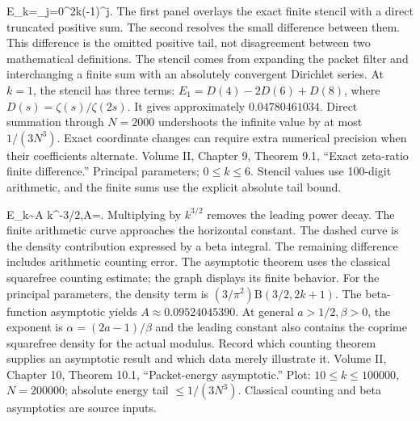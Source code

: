 {E_k=\sum_{j=0}^{2k}(-1)^j.}
{The first panel overlays the exact finite stencil with a direct truncated positive sum. The second resolves the small difference between them. This difference is the omitted positive tail, not disagreement between two mathematical definitions. The stencil comes from expanding the packet filter and interchanging a finite sum with an absolutely convergent Dirichlet series.}
{At $k=1$, the stencil has three terms: $E_1=D(4)-2D(6)+D(8)$, where $D(s)=\zeta(s)/\zeta(2s)$. It gives approximately $0.04780461034$. Direct summation through $N=2000$ undershoots the infinite value by at most $1/(3N^3)$.}
{Exact coordinate changes can require extra numerical precision when their coefficients alternate.}
{Volume II, Chapter 9, Theorem 9.1, ``Exact zeta-ratio finite difference.'' Principal parameters; $0\le k\le6$. Stencil values use 100-digit arithmetic, and the finite sums use the explicit absolute tail bound.}

{E_k\sim A k^{-3/2},\qquad A=.}
{Multiplying by $k^{3/2}$ removes the leading power decay. The finite arithmetic curve approaches the horizontal constant. The dashed curve is the density contribution expressed by a beta integral. The remaining difference includes arithmetic counting error. The asymptotic theorem uses the classical squarefree counting estimate; the graph displays its finite behavior.}
{For the principal parameters, the density term is $(3/\pi^2)\mathrm B(3/2,2k+1)$. The beta-function asymptotic yields $A\approx0.09524045390$. At general $a>1/2,\beta>0$, the exponent is $\alpha=(2a-1)/\beta$ and the leading constant also contains the coprime squarefree density for the actual modulus.}
{Record which counting theorem supplies an asymptotic result and which data merely illustrate it.}
{Volume II, Chapter 10, Theorem 10.1, ``Packet-energy asymptotic.'' Plot: $10\le k\le100000$, $N=200000$; absolute energy tail $\le1/(3N^3)$. Classical counting and beta asymptotics are source inputs.}


